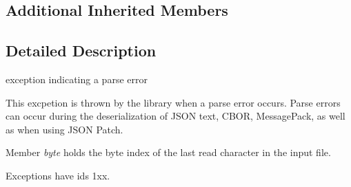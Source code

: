 \subsection*{Additional Inherited Members}


\subsection{Detailed Description}
exception indicating a parse error 

This excpetion is thrown by the library when a parse error occurs. Parse errors can occur during the deserialization of J\+S\+ON text, C\+B\+OR, Message\+Pack, as well as when using J\+S\+ON Patch.

Member {\itshape byte} holds the byte index of the last read character in the input file.

Exceptions have ids 1xx.

